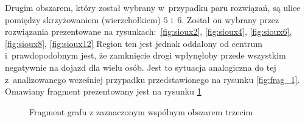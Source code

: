 \documentclass[twoside,12pt]{report}
\begin{document}
Drugim obszarem, który został wybrany w~przypadku paru rozwiązań, są ulice pomiędzy skrzyżowaniem (wierzchołkiem) $5$ i~$6$. Został on wybrany przez rozwiązania prezentowane na rysunkach:~\ref{fig:sioux2}, \ref{fig:sioux4}, \ref{fig:sioux6}, \ref{fig:sioux8}, \ref{fig:sioux12} Region ten jest jednak oddalony od centrum i~prawdopodobnym jest, że zamknięcie drogi wpłynęłoby przede wszystkim negatywnie na dojazd dla wielu osób. Jest to sytuacja analogiczna do tej z~analizowanego wcześniej przypadku przedstawionego na rysunku \ref{fig:frag_1}. Omawiany fragment prezentowany jest na rysunku \ref{fig:frag_3}

\begin{figure}[htbp]
\centering
{}
\caption{Fragment grafu z zaznaczonym wspólnym obszarem trzecim}
\label{fig:frag_3}
\end{figure}
\end{document}
